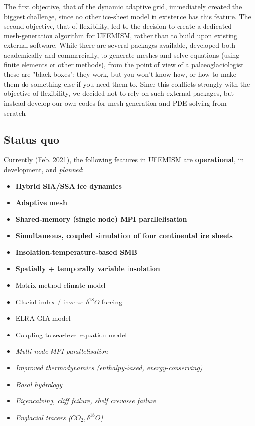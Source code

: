 \documentclass{article}
\begin{document}
The first objective, that of the dynamic adaptive grid, immediately created the biggest challenge, since no other ice-sheet model in existence has this feature. The second objective, that of flexibility, led to the decision to create a dedicated mesh-generation algorithm for UFEMISM, rather than to build upon existing external software. While there are several packages available, developed both academically and commercially, to generate meshes and solve equations (using finite elements or other methods), from the point of view of a palaeoglaciologist these are "black boxes": they work, but you won't know how, or how to make them do something else if you need them to. Since this conflicts strongly with the objective of flexibility, we decided not to rely on such external packages, but instead develop our own codes for mesh generation and PDE solving from scratch.

\subsection{Status quo}

Currently (Feb. 2021), the following features in UFEMISM are \textbf{operational}, in development, and \textit{planned}:

\begin{itemize}

\item \textbf{Hybrid SIA/SSA ice dynamics}
\item \textbf{Adaptive mesh}
\item \textbf{Shared-memory (single node) MPI parallelisation}
\item \textbf{Simultaneous, coupled simulation of four continental ice sheets}
\item \textbf{Insolation-temperature-based SMB}
\item \textbf{Spatially + temporally variable insolation}
\\
\item Matrix-method climate model
\item Glacial index / inverse-$\delta^{18}O$ forcing
\item ELRA GIA model
\item Coupling to sea-level equation model
\\
\item \textit{Multi-node MPI parallelisation}
\item \textit{Improved thermodynamics (enthalpy-based, energy-conserving)}
\item \textit{Basal hydrology}
\item \textit{Eigencalving, cliff failure, shelf crevasse failure}
\item \textit{Englacial tracers ($CO_2, \delta^{18}O$)}

\end{itemize}
\end{document}
